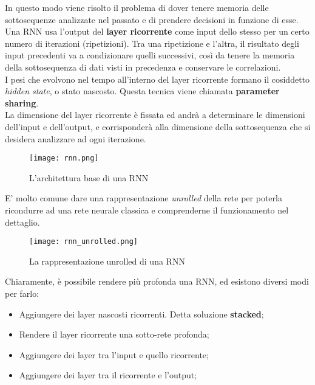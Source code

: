 In questo modo viene risolto il problema di dover tenere memoria delle sottosequenze analizzate nel passato e di prendere decisioni in funzione di esse.\\
Una RNN usa l'output del \textbf{layer ricorrente} come input dello stesso per un certo numero di iterazioni (ripetizioni). Tra una ripetizione e l'altra, il risultato degli input precedenti va a condizionare quelli successivi, così da tenere la memoria della sottosequenza di dati visti in precedenza e conservare le correlazioni.\\
I pesi che evolvono nel tempo all'interno del layer ricorrente formano il cosiddetto \textit{hidden state}, o stato nascosto. Questa tecnica viene chiamata \textbf{parameter sharing}.\\
La dimensione del layer ricorrente è fissata ed andrà a determinare le dimensioni dell'input e dell'output, e corrisponderà alla dimensione della sottosequenza che si desidera analizzare ad ogni iterazione.
\begin{figure}[H]
	\centering
	\texttt{[image: rnn.png]}
	\caption{L'architettura base di una RNN}
	\label{fig:rnn}
\end{figure}
E' molto comune dare una rappresentazione \textit{unrolled} della rete per poterla ricondurre ad una rete neurale classica e comprenderne il funzionamento nel dettaglio.
\begin{figure}[H]
	\centering
	\texttt{[image: rnn\_unrolled.png]}
	\caption{La rappresentazione unrolled di una RNN}
	\label{fig:rnn_unrolled}
\end{figure}

Chiaramente, è possibile rendere più profonda una RNN, ed esistono diversi modi per farlo:
\begin{itemize}
	\item Aggiungere dei layer nascosti ricorrenti. Detta soluzione \textbf{stacked};
	\item Rendere il layer ricorrente una sotto-rete profonda;
	\item Aggiungere dei layer tra l'input e quello ricorrente;
	\item Aggiungere dei layer tra il ricorrente e l'output;
\end{itemize}

